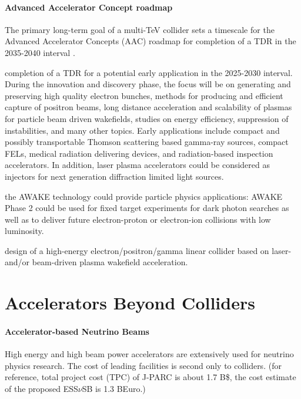 \paragraph*{Advanced Accelerator Concept roadmap}

 The primary long-term goal of a multi-TeV collider sets a timescale for the Advanced Accelerator Concepts (AAC) roadmap for completion of a TDR in the 2035-2040 interval \cite{wim1}.
 
 completion of a TDR for a potential early application in the 2025-2030 interval. During the innovation and discovery phase, the focus will be on generating and preserving high quality electron bunches, methods for producing and efficient capture of positron beams, long distance acceleration and scalability of plasmas for particle beam driven wakefields, studies on energy efficiency, suppression of instabilities, and many other topics. Early applications include compact and possibly transportable Thomson scattering based gamma-ray sources, compact FELs, medical radiation delivering devices, and radiation-based inspection accelerators. In addition, laser plasma accelerators could be considered as injectors for next generation diffraction limited light sources.

 the AWAKE technology could provide particle physics applications: AWAKE Phase 2 could be used for fixed target experiments for dark photon searches as well as to deliver future electron-proton or electron-ion collisions with low luminosity.

 design of a high-energy electron/positron/gamma linear collider based on laser- and/or beam-driven plasma wakefield acceleration.


\section{Accelerators Beyond Colliders}

\paragraph*{Accelerator-based Neutrino Beams}

High energy and high beam power accelerators are extensively used for neutrino physics research. The cost of leading facilities is second only to colliders. (for reference, total project cost (TPC) of J-PARC \cite{id76} is about 1.7 B\$, the cost estimate of the proposed ESS$\nu$SB \cite{id98} is 1.3 BEuro.)

